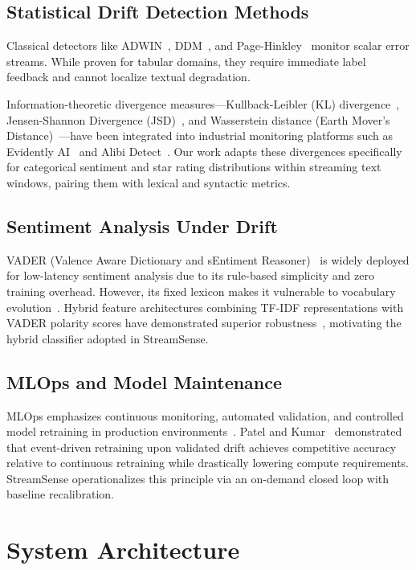 \documentclass[conference]{IEEEtran}
\begin{document}
\subsection{Statistical Drift Detection Methods}
Classical detectors like ADWIN~\cite{bifet2007learning}, DDM~\cite{baena2006early}, and Page-Hinkley~\cite{page1954continuous} monitor scalar error streams. While proven for tabular domains, they require immediate label feedback and cannot localize textual degradation.

Information-theoretic divergence measures---Kullback-Leibler (KL) divergence~\cite{kullback1951information}, Jensen-Shannon Divergence (JSD)~\cite{lin1991divergence}, and Wasserstein distance (Earth Mover's Distance)~\cite{kantorovich1942translocation}---have been integrated into industrial monitoring platforms such as Evidently AI~\cite{evidently2024} and Alibi Detect~\cite{seldon2024alibi}. Our work adapts these divergences specifically for categorical sentiment and star rating distributions within streaming text windows, pairing them with lexical and syntactic metrics.

\subsection{Sentiment Analysis Under Drift}
VADER (Valence Aware Dictionary and sEntiment Reasoner)~\cite{hutto2014vader} is widely deployed for low-latency sentiment analysis due to its rule-based simplicity and zero training overhead. However, its fixed lexicon makes it vulnerable to vocabulary evolution~\cite{agrawal2024what}. Hybrid feature architectures combining TF-IDF representations with VADER polarity scores have demonstrated superior robustness~\cite{ahuja2019impact}, motivating the hybrid classifier adopted in StreamSense.

\subsection{MLOps and Model Maintenance}
MLOps emphasizes continuous monitoring, automated validation, and controlled model retraining in production environments~\cite{kreuzberger2023machine}. Patel and Kumar~\cite{patel2026concept} demonstrated that event-driven retraining upon validated drift achieves competitive accuracy relative to continuous retraining while drastically lowering compute requirements. StreamSense operationalizes this principle via an on-demand closed loop with baseline recalibration.

\section{System Architecture}
\end{document}
